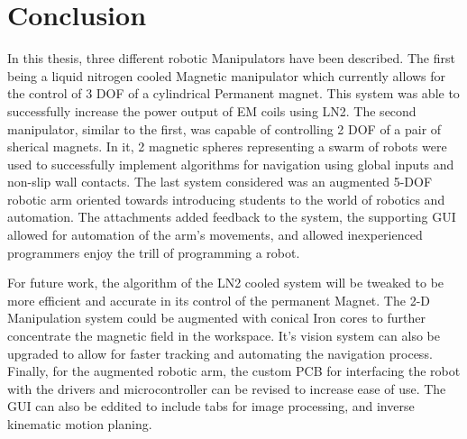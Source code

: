 
\chapter[Conclusion]{Conclusion}
\label{chap-conc}

In this thesis, three different robotic Manipulators have been described. The first being a liquid nitrogen cooled Magnetic manipulator which currently allows for the control of 3 DOF of a cylindrical Permanent magnet. This system was able to successfully increase the power output of EM coils using LN2. The second manipulator, similar to the first, was capable of controlling 2 DOF of a pair of sherical magnets. In it, 2 magnetic spheres representing a swarm of robots were used to successfully implement algorithms  for navigation using global inputs and non-slip wall contacts. The last system considered was an augmented 5-DOF robotic arm oriented towards introducing students to the world of robotics and automation. The attachments added feedback to the system, the supporting GUI allowed for automation of the arm's movements,  and allowed inexperienced programmers enjoy the trill of programming a robot. 

For future work, the algorithm of the LN2 cooled system will be tweaked to be more efficient and accurate in its control of the permanent Magnet. The 2-D Manipulation system could be augmented with conical Iron cores to further concentrate the magnetic field in the workspace. It's vision system can also be upgraded to allow for faster tracking and automating the navigation process. Finally, for the augmented robotic arm, the custom PCB for interfacing the robot with the drivers and microcontroller can be revised to increase ease of use. The GUI can also be eddited to include tabs for image processing, and inverse kinematic motion planing. 




